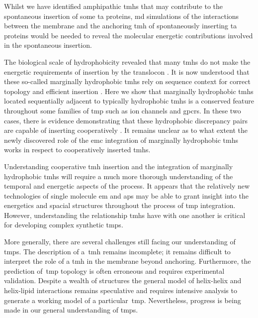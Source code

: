Whilst we have identified amphipathic \gls{tmh}s that may contribute to the spontaneous insertion of some \gls{ta} proteins, \gls{md} simulations of the interactions between the membrane and the anchoring \gls{tmh} of spontaneously inserting \gls{ta} proteins would be needed to reveal the molecular energetic contributions involved in the spontaneous insertion.


The biological scale of hydrophobicity revealed that many \gls{tmh}s do not make the energetic requirements of insertion by the translocon \cite{Hessa2007}.
It is now understood that these so\--called marginally hydrophobic \gls{tmh}s rely on sequence context for correct topology \cite{Ojemalm2012} and efficient insertion \cite{Hedin2010, Junne2017, Virkki2014}.
Here we show that marginally hydrophobic \gls{tmh}s located sequentially adjacent to typically hydrophobic \gls{tmh}s is a conserved feature throughout some families of \gls{tmp} such as ion channels and \gls{gpcr}s.
In these two cases, there is evidence demonstrating that these hydrophobic discrepancy pairs are capable of inserting cooperatively \cite{Ismail2008, Zhang2007, Sato2002, Sato2003, Cymer2015}.
It remains unclear as to what extent the newly discovered role of the \gls{emc} integration of marginally hydrophobic \gls{tmh}s \cite{Shurtleff2018} works in respect to cooperatively inserted \gls{tmh}s.

Understanding cooperative \gls{tmh} insertion and the integration of marginally hydrophobic \gls{tmh}s will require a much more thorough understanding of the temporal and energetic aspects of the process.
It appears that the relatively new technologies of single molecule \gls{em} and \gls{ap}s may be able to grant insight into the energetics and spacial structures throughout the process of \gls{tmp} integration.%
However, understanding the relationship \gls{tmh}s have with one another is critical for developing complex synthetic \gls{tmp}s.

More generally, there are several challenges still facing our understanding of \gls{tmp}s.
The description of a~\gls{tmh} remains incomplete; it remains difficult to interpret the role of a \gls{tmh} in the membrane beyond anchoring.
Furthermore, the prediction of~\gls{tmp} topology is often erroneous and requires experimental validation.
Despite a wealth of structures the general model of helix\--helix and helix\--lipid interactions remains speculative and requires intensive analysis to generate a working model of a particular~\gls{tmp}.
Nevertheless, progress is being made in our general understanding of \gls{tmp}s.
